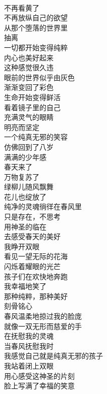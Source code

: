 \begin{poem}[春风里的戒者]
    \begin{multicols}{3}
        \centering~\\
        不再看黄了 \\ 不再放纵自己的欲望 \\ 从那个堕落的世界里 \\ 抽离 \\ 一切都开始变得纯粹 \\ 内心也美好起来 \\ 这种感觉很久违 \\ 眼前的世界似乎由灰色 \\ 渐渐变回了彩色 \\ 生命开始变得鲜活 \\ 看着镜子里的自己 \\ 充满灵气的眼睛 \\ 明亮而坚定 \\ 一个纯真无邪的笑容 \\ 仿佛回到了八岁 \\ 满满的少年感 \\ 春天来了 \\ 万物复苏了 \\ 绿柳儿随风飘舞 \\ 花儿也绽放了 \\ 纯净的灵魂徜徉在春风里 \\ 只是存在，不思考 \\ 用神圣的临在 \\ 去感受春天的美好 \\ 我睁开双眼 \\ 看见一望无际的花海 \\ 闪烁着耀眼的光芒 \\ 孩子们在欢快地奔跑 \\ 我幸福地笑了 \\ 那种纯粹，那种美好 \\ 刻骨铭心 \\ 春风温柔地掠过我的脸庞 \\ 就像一双无形而慈爱的手 \\ 在抚慰我的灵魂 \\ 当春风抚慰我时 \\ 我感觉自己就是纯真无邪的孩子 \\ 我站着闭上双眼 \\ 用心感受这神圣的片刻 \\ 脸上写满了幸福的笑意
    \end{multicols}
\end{poem}

